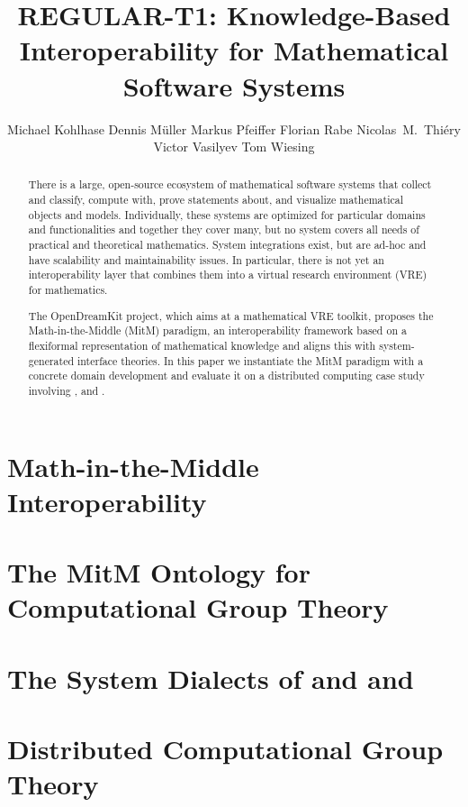 \documentclass{llncs}
\title{REGULAR-T1: Knowledge-Based Interoperability for Mathematical Software Systems}
\author{
Michael Kohlhase\inst{1} 
Dennis M\"uller\inst{1} 
Markus Pfeiffer\inst{3} 
Florian Rabe\inst{2} 
Nicolas~M.~Thiéry\inst{4} 
Victor Vasilyev\inst{3} 
Tom Wiesing\inst{1}
}
\institute{
   FAU Erlangen-N\"urnberg
   \and Jacobs University Bremen
   \and University of St~Andrews 
   \and Universit\'e Paris-Sud
}
\begin{document}
\maketitle
\begin{abstract}
  There is a large, open-source ecosystem of mathematical software systems that collect and
  classify, compute with, prove statements about, and visualize mathematical objects and
  models. Individually, these systems are optimized for particular domains and
  functionalities and together they cover many, but no system covers all needs of
  practical and theoretical mathematics. System integrations exist, but are ad-hoc and
  have scalability and maintainability issues. In particular, there is not yet an
  interoperability layer that combines them into a virtual research environment (VRE) for
  mathematics.
  
  The OpenDreamKit project, which aims at a mathematical VRE toolkit, proposes the
  Math-in-the-Middle (MitM) paradigm, an interoperability framework based on a flexiformal
  representation of mathematical knowledge and aligns this with system-generated interface
  theories. In this paper we instantiate the MitM paradigm with a concrete domain
  development and evaluate it on a distributed computing case study involving \GAP,
  \Sage and \Singular.
\end{abstract}


\section{Math-in-the-Middle Interoperability}\label{sec:mitm}


\section{The MitM Ontology for Computational Group Theory}\label{sec:cgt}


\section{The System Dialects of \GAP and \Sage and \Singular}\label{sec:apit}


\section{Distributed Computational Group Theory}\label{sec:case}


  
  
\printbibliography
\newpage
% 
\end{document}
